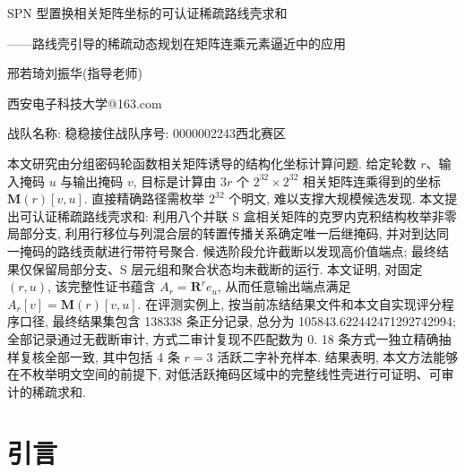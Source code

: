 \documentclass[UTF8,a4paper,zihao=-4,fontset=fandol]{ctexart}
\newcommand{\fangsongcustom}{\CJKfamily{fang}}
\numberwithin{equation}{section}
\theoremstyle{definition}
\theoremstyle{plain}
\theoremstyle{remark}
\begin{document}

\begin{center}
  {\heiti{} SPN 型置换相关矩阵坐标的可认证稀疏路线壳求和\par}
  \vspace{0.45em}
  {\heiti{} ——路线壳引导的稀疏动态规划在矩阵连乘元素逼近中的应用\par}
  \vspace{1.1em}
  {\fangsongcustom{} 邢若琦\quad 刘振华(指导老师)\par}
  \vspace{0.35em}
  {\songti{} 西安电子科技大学@163.com\par}
  \vspace{0.25em}
  {\songti{} 战队名称: 稳稳接住\quad 战队序号: 0000002243\quad 西北赛区\par}
\end{center}
\vspace{0.9em}

{\songti{}
本文研究由分组密码轮函数相关矩阵诱导的结构化坐标计算问题. 给定轮数 $r$、输入掩码 $u$ 与输出掩码 $v$, 目标是计算由 $3r$ 个 $2^{32}\times 2^{32}$ 相关矩阵连乘得到的坐标 $\bm{M}(r)[v,u]$. 直接精确路径需枚举 $2^{32}$ 个明文, 难以支撑大规模候选发现. 本文提出可认证稀疏路线壳求和: 利用八个并联 S 盒相关矩阵的克罗内克积结构枚举非零局部分支, 利用行移位与列混合层的转置传播关系确定唯一后继掩码, 并对到达同一掩码的路线贡献进行带符号聚合. 候选阶段允许截断以发现高价值端点; 最终结果仅保留局部分支、S 层元组和聚合状态均未截断的运行. 本文证明, 对固定 $(r,u)$, 该完整性证书蕴含 $A_r=\bm{R}^{r}e_u$, 从而任意输出端点满足 $A_r[v]=\bm{M}(r)[v,u]$. 在评测实例上, 按当前冻结结果文件和本文自实现评分程序口径, 最终结果集包含 138338 条正分记录, 总分为 105843.622442471292742994; 全部记录通过无截断审计, 方式二审计复现不匹配数为 0. 18 条方式一独立精确抽样复核全部一致, 其中包括 4 条 $r=3$ 活跃二字补充样本. 结果表明, 本文方法能够在不枚举明文空间的前提下, 对低活跃掩码区域中的完整线性壳进行可证明、可审计的稀疏求和. }

\vspace{0.6em}

\section{引言}
\end{document}
